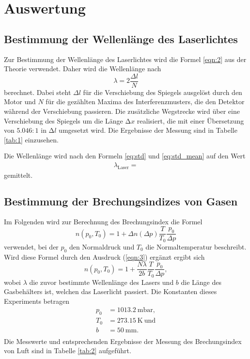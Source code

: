 \section{Auswertung}
\label{sec:Auswertung}

\subsection{Bestimmung der Wellenlänge des Laserlichtes}

Zur Bestimmung der Wellenlänge des Laserlichtes wird die Formel \eqref{eqn:2} aus der Theorie verwendet.
Daher wird die Wellenlänge nach
\begin{equation}
  \lambda = 2\frac{\Delta l}{N}
\end{equation}
berechnet.
Dabei steht $\Delta l$ für die Verschiebung des Spiegels ausgelöst durch den Motor und $N$ für die gezählten Maxima des Interferenzmusters, die den Detektor während der Verschiebung passieren.
Die zusätzliche Wegstrecke wird über eine Verschiebung des Spiegels um die Länge $\increment{x}$ realisiert, die mit einer Übersetzung von $5.046:1$ in $\increment{l}$ umgesetzt wird.
Die Ergebnisse der Messung sind in Tabelle \ref{tab:1} einzusehen.



Die Wellenlänge wird nach den Formeln \eqref{eq:std} und \eqref{eq:std_mean} auf den Wert
\begin{align*}
  \lambda_{\text{Laser}} = 
\end{align*}
gemittelt.

\subsection{Bestimmung der Brechungsindizes von Gasen}

Im Folgenden wird zur Berechnung des Brechungsindex die Formel
\begin{equation}
  n(p_0,T_0) = 1 +\Delta n(\Delta p) \frac{T}{T_0}\frac{p_0}{\Delta p}
\end{equation}
verwendet, bei der $p_0$ den Normaldruck und $T_0$ die Normaltemperatur beschreibt.
Wird diese Formel durch den Ausdruck (\ref{eqn:3}) ergänzt ergibt sich
\begin{equation}
  n(p_0,T_0) = 1 +\frac{N \lambda}{2b} \frac{T}{T_0}\frac{p_0}{\Delta p},
\end{equation}
wobei $\lambda$ die zuvor bestimmte Wellenlänge des Lasers und $b$ die Länge des Gasbehälters ist, welchen das Laserlicht passiert.
Die Konstanten dieses Experiments betragen
\begin{align*}
  p_0 &= \SI{1013,2}{\milli\bar},\\
  T_0 &= \SI{273,15}{\kelvin} \: \text{und}\\
  b   &= \SI{50}{\milli\metre}.\\
\end{align*}
Die Messwerte und entsprechenden Ergebnisse der Messung des Brechungsindex von Luft sind in Tabelle \ref{tab:2} aufgeführt.


